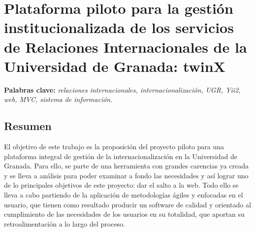 \chapter*{Plataforma piloto para la gestión institucionalizada de los servicios de Relaciones Internacionales de la Universidad de Granada: twinX}

\textbf{Palabras clave:} \textit{relaciones internacionales, internacionalización, UGR, Yii2, web, MVC, sistema de información.}

\section*{Resumen}

\noindent El objetivo de este trabajo es la proposición del proyecto piloto para una plataforma integral de gestión de la internacionalización en la Universidad de Granada. Para ello, se parte de una herramienta con grandes carencias ya creada y se lleva a análisis para poder examinar a fondo las necesidades y así lograr uno de lo principales objetivos de este proyecto: dar el salto a la web. Todo ello se lleva a cabo partiendo de la aplicación de metodologías ágiles y enfocadas en el usuario, que tienen como resultado producir un software de calidad y orientado al cumplimiento de las necesidades de los usuarios en su totalidad, que aportan su retroalimentación a lo largo del proceso.